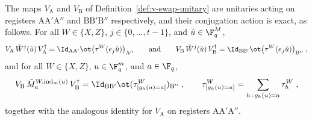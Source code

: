 \begin{lemma}\label{lem:v-swap-conjugation}
	\leanok
	The maps $V_{\mathrm{A}}$ and $V_{\mathrm{B}}$ of Definition~\ref{def:v-swap-unitary} are unitaries acting on registers $\mathrm{A}\mathrm{A}'\mathrm{A}''$ and $\mathrm{B}\mathrm{B}'\mathrm{B}''$ respectively, and their conjugation action is exact, as follows. For all $W \in \{X,Z\}$, $j \in \{0,\ldots,t-1\}$, and $\tilde{u} \in \F_q^M$,
	\begin{equation}\label{eq:v-swap-obs-conjugation}
		V_{\mathrm{A}} \, \tilde{W}^j(\tilde{u}) \, V_{\mathrm{A}}^\dagger = \Id_{\mathrm{A}\mathrm{A}'} \ot \bigl( \tau^W(e_j \tilde{u}) \bigr)_{\mathrm{A}''}
		\qquad \text{and} \qquad
		V_{\mathrm{B}} \, \tilde{W}^j(\tilde{u}) \, V_{\mathrm{B}}^\dagger = \Id_{\mathrm{B}\mathrm{B}'} \ot \bigl( \tau^W(e_j \tilde{u}) \bigr)_{\mathrm{B}''}\;,
	\end{equation}
	and for all $W \in \{X,Z\}$, $u \in \F_q^m$, and $a \in \F_q$,
	\begin{equation}\label{eq:qld-unitary-6}
		V_{\mathrm{B}} \, \tilde{M}^{W,\mathrm{ind}_m(u)}_a \, V_{\mathrm{B}}^\dagger = \Id_{\mathrm{B}\mathrm{B}'} \ot (\tau^W_{[g_h(u)=a]})_{\mathrm{B}''}\;,
		\qquad
		\tau^W_{[g_h(u)=a]} = \sum_{h \,:\, g_h(u) = a} \tau^W_h\;,
	\end{equation}
	together with the analogous identity for $V_{\mathrm{A}}$ on registers $\mathrm{A}\mathrm{A}'\mathrm{A}''$.
\end{lemma}

